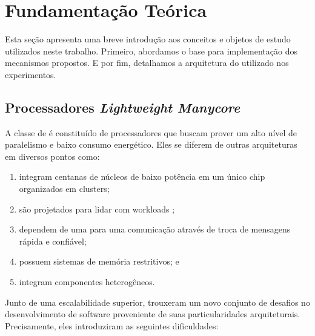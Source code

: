\section{Fundamentação Teórica}
\label{sec:fundamentacao}

	Esta seção apresenta uma breve introdução aos conceitos e objetos de estudo
	utilizados neste trabalho. Primeiro, abordamos o \os base para
	implementação dos mecanismos propostos. E por fim, detalhamos a arquitetura
	do \lw utilizado nos experimentos.


\subsection{Processadores \textit{Lightweight Manycore}}
\label{subsec:mppa}

	A classe de \lws é constituído de processadores que buscam prover um alto
	nível de paralelismo e baixo consumo energético. Eles se diferem de outras
	arquiteturas em diversos pontos como:
	\begin{enumerate}[label=\roman*.]
		\item integram centanas de núcleos de baixo potência em um único chip
			organizados em clusters;
		\item são projetados para lidar com workloads \mimd;
		\item dependem de uma \noc para uma comunicação através de troca de
			mensagens rápida e confiável;
		\item possuem sistemas de memória restritivos; e
		\item integram componentes heterogêneos.
	\end{enumerate}

	Junto de uma escalabilidade superior, \lws trouxeram um novo conjunto de
	desafios no desenvolvimento de software proveniente de suas
	particularidades arquiteturais. Precisamente, eles introduziram as
	seguintes dificuldades:

